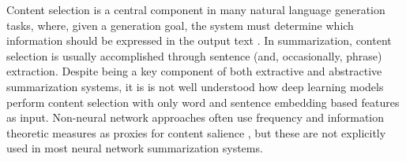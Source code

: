 Content selection is a central component in many natural language generation
tasks,
where, given a generation goal, the system must determine which information
should be expressed in the output text \cite{gatt2018survey}.
In summarization, content selection is usually accomplished through sentence (and,
occasionally, phrase) extraction.
Despite being a key component of both
extractive and abstractive summarization systems, it is is not well
understood how deep learning models perform content selection with only word and 
sentence
embedding based features as input.
Non-neural network approaches often use frequency and information theoretic measures as proxies
for content salience \cite{hong2014improving}, but these are not explicitly %
used in most neural network summarization systems.


